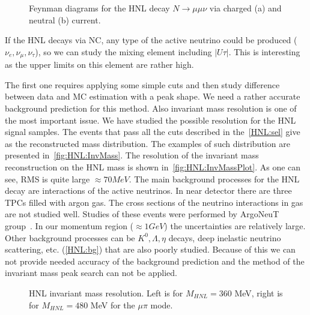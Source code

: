 \documentclass[../main.tex]{subfiles}
\begin{document}
\begin{figure}[h!]
    \begin{minipage}[h]{0.49\linewidth}
    \end{minipage}
    \hfill
    \begin{minipage}[h]{0.49\linewidth}
    \end{minipage}
    \caption{Feynman diagrams for the HNL decay $N\to\mu\mu\nu$ via charged (a) and neutral (b) current.}
    \label{fig:DimuonFeynman}
\end{figure}

If the HNL decays via NC, any type of the active neutrino could be produced ($\nu_{e}, \nu_{\mu}, \nu_{\tau}$), so we can study the mixing element including $|U\tau|$. This is interesting as the upper limits on this element are rather high.

The first one requires applying some simple cuts and then study difference between data and MC estimation with a peak shape. We need a rather accurate background prediction for this method. Also invariant mass resolution is one of the most important issue. We have studied the possible resolution for the HNL signal samples. The events that pass all the cuts described in the~\autoref{HNL:sel} give as the reconstructed mass distribution. The examples of such distribution are presented in~\autoref{fig:HNL:InvMass}. The resolution of the invariant mass reconstruction on the HNL mass is shown in~\autoref{fig:HNL:InvMassPlot}. As one can see, RMS is quite large $\approx70MeV$. The main background processes for the HNL decay are  interactions of the active neutrinos. In near detector there are three TPCs filled with argon gas. The cross sections of the neutrino interactions in gas are not studied well. Studies of these events were performed by ArgoNeuT group~\cite{Acciarri2014}. In our momentum region ($\approx1GeV$) the uncertainties are relatively large. Other background processes can be $K^0, \Lambda, \eta$ decays, deep inelastic neutrino scattering, etc. (\autoref{HNL:bg}) that are also poorly studied. Because of this we can not provide needed accuracy of the background prediction and the method of the invariant mass peak search can not be applied.
\begin{figure}[h!]
    \begin{minipage}[h]{0.49\linewidth}
    \end{minipage}
    \hfill
    \begin{minipage}[h]{0.49\linewidth}
    \end{minipage}
    \caption{HNL invariant mass resolution. Left is for $M_{HNL}=360$ MeV, right is for $M_{HNL}=480$ MeV for the $\mu\pi$ mode.}
    \label{fig:HNL:InvMass}
\end{figure}
\end{document}
